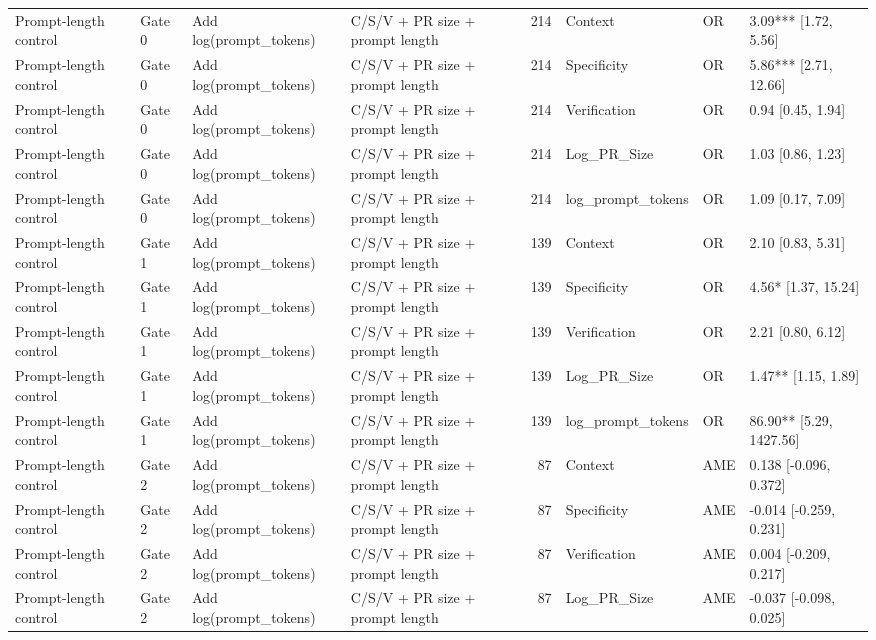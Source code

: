 \begin{table}
\begin{tabular}{llllrlll}
Prompt-length control & Gate 0 & Add log(prompt\_tokens) & C/S/V + PR size + prompt length & 214 & Context & OR & 3.09*** [1.72, 5.56] \\
Prompt-length control & Gate 0 & Add log(prompt\_tokens) & C/S/V + PR size + prompt length & 214 & Specificity & OR & 5.86*** [2.71, 12.66] \\
Prompt-length control & Gate 0 & Add log(prompt\_tokens) & C/S/V + PR size + prompt length & 214 & Verification & OR & 0.94 [0.45, 1.94] \\
Prompt-length control & Gate 0 & Add log(prompt\_tokens) & C/S/V + PR size + prompt length & 214 & Log\_PR\_Size & OR & 1.03 [0.86, 1.23] \\
Prompt-length control & Gate 0 & Add log(prompt\_tokens) & C/S/V + PR size + prompt length & 214 & log\_prompt\_tokens & OR & 1.09 [0.17, 7.09] \\
Prompt-length control & Gate 1 & Add log(prompt\_tokens) & C/S/V + PR size + prompt length & 139 & Context & OR & 2.10 [0.83, 5.31] \\
Prompt-length control & Gate 1 & Add log(prompt\_tokens) & C/S/V + PR size + prompt length & 139 & Specificity & OR & 4.56* [1.37, 15.24] \\
Prompt-length control & Gate 1 & Add log(prompt\_tokens) & C/S/V + PR size + prompt length & 139 & Verification & OR & 2.21 [0.80, 6.12] \\
Prompt-length control & Gate 1 & Add log(prompt\_tokens) & C/S/V + PR size + prompt length & 139 & Log\_PR\_Size & OR & 1.47** [1.15, 1.89] \\
Prompt-length control & Gate 1 & Add log(prompt\_tokens) & C/S/V + PR size + prompt length & 139 & log\_prompt\_tokens & OR & 86.90** [5.29, 1427.56] \\
Prompt-length control & Gate 2 & Add log(prompt\_tokens) & C/S/V + PR size + prompt length & 87 & Context & AME & 0.138 [-0.096, 0.372] \\
Prompt-length control & Gate 2 & Add log(prompt\_tokens) & C/S/V + PR size + prompt length & 87 & Specificity & AME & -0.014 [-0.259, 0.231] \\
Prompt-length control & Gate 2 & Add log(prompt\_tokens) & C/S/V + PR size + prompt length & 87 & Verification & AME & 0.004 [-0.209, 0.217] \\
Prompt-length control & Gate 2 & Add log(prompt\_tokens) & C/S/V + PR size + prompt length & 87 & Log\_PR\_Size & AME & -0.037 [-0.098, 0.025] \\
\bottomrule
\end{tabular}
\end{table}

